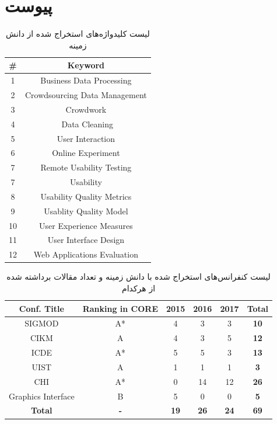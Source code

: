 \documentclass{article}
\theoremstyle{definition}
\begin{document}
\section{پیوست}
\label{sec:appendix}
\appendix
\begin{table}[H]
	\caption{لیست کلیدواژه‌های استخراج شده از دانش زمینه}
	\label{keywrods}
	\centering\begin{latin}
		\begin{tabular}{c|c}	
			\# & Keyword \\
			\hline
			1 & Business Data Processing\\ 
			2 & Crowdsourcing Data Management\\ 
			3 & Crowdwork\\ 
			4 &‌ Data Cleaning\\ 
			5 & User Interaction\\ 
			6 & Online Experiment\\ 
			7 & Remote Usability Testing \\
			7 & Usability\\ 
			8 & Usability Quality Metrics\\ 
			9 & Usablity Quality Model\\ 
			10 & User Experience Measures \\
			11 & User Interface Design\\ 
			12 & Web Applications Evaluation\\ 
		\end{tabular} 
	\end{latin}
\end{table}
	
	\begin{table}[H]
		\caption{لیست کنفرانس‌های استخراج شده با دانش زمینه و تعداد مقالات برداشته شده از هرکدام}
		\label{confs}
		\centering\begin{latin}
			\begin{tabular}{c|c|c|c|c|c}
				Conf. Title        & Ranking in CORE & 2015        & 2016        & 2017        & \textbf{Total} \\ \hline
				SIGMOD             & A*              & 4           & 3           & 3           & \textbf{10}    \\ \hline
				CIKM               & A               & 4           & 3           & 5           & \textbf{12}    \\ \hline
				ICDE               & A*              & 5           & 5           & 3           & \textbf{13}    \\ \hline
				UIST               & A               & 1           & 1           & 1           & \textbf{3}     \\ \hline
				CHI                & A*              & 0           & 14          & 12          & \textbf{26}    \\ \hline
				Graphics Interface & B               & 5           & 0           & 0           & \textbf{5}     \\ \hline
				\textbf{Total}     & \textbf{-}      & \textbf{19} & \textbf{26} & \textbf{24} & \textbf{69}   
			\end{tabular}
		\end{latin}
	\end{table}
	
\end{document}
